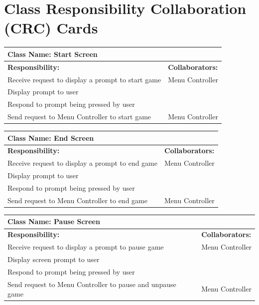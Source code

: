 \documentclass[12pt, titlepage]{article}
\begin{document}
	
\section{Class Responsibility Collaboration (CRC) Cards}
\label{sec:class_responsibility_collaboration_crc_cards}



	\begin{table}[H]
		\centering
		\begin{tabular}{|p{10cm}|p{5cm}|}
		\hline 
		 \multicolumn{2}{|l|}{\textbf{Class Name: Start Screen}} \\
		\hline
		\textbf{Responsibility:} & \textbf{Collaborators:} \\
		\hline
		 Receive request to display a prompt to start game& Menu Controller \\
		\hline
		 Display prompt to user& \\
		\hline
		 Respond to prompt being pressed by user& \\
		\hline
		 Send request to Menu Controller to start game& Menu Controller \\
		\hline
		\end{tabular}
	\end{table}
	
	\begin{table}[H]
		\centering
		\begin{tabular}{|p{10cm}|p{5cm}|}
		\hline 
		 \multicolumn{2}{|l|}{\textbf{Class Name: End Screen}} \\
		\hline
		\textbf{Responsibility:} & \textbf{Collaborators:} \\
		\hline
		 Receive request to display a prompt to end game& Menu Controller \\
		\hline
		 Display prompt to user& \\
		\hline
		 Respond to prompt being pressed by user& \\
		\hline
		 Send request to Menu Controller to end game& Menu Controller \\
		\hline
		\end{tabular}
	\end{table}
	
	\begin{table}[H]
		\centering
		\begin{tabular}{|p{10cm}|p{5cm}|}
		\hline 
		 \multicolumn{2}{|l|}{\textbf{Class Name: Pause Screen}} \\
		\hline
		\textbf{Responsibility:} & \textbf{Collaborators:} \\
		\hline
		 Receive request to display a prompt to pause game& Menu Controller \\
		\hline
		 Display screen prompt to user& \\
		\hline
		 Respond to prompt being pressed by user& \\
		\hline
		 Send request to Menu Controller to pause and unpause game& Menu Controller \\
		\hline
		\end{tabular}
	\end{table}
	
\end{document}
